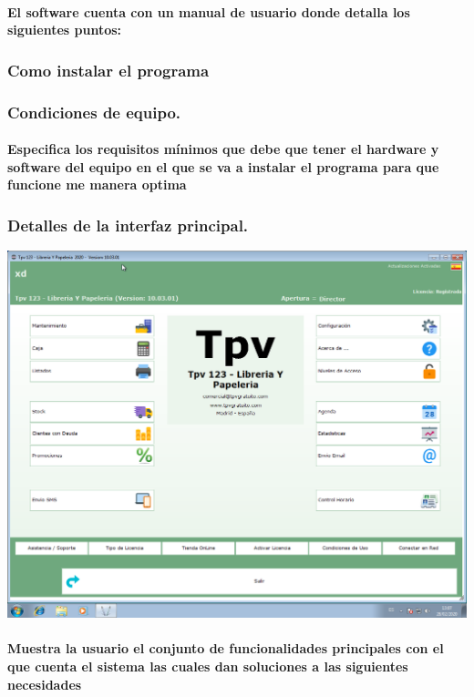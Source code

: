 \documentclass[12pt,a4paper]{ articule }
\begin{document}
\paragraph{El software cuenta con un manual de usuario donde detalla los siguientes puntos:}
\subsubsection*{Como instalar el programa}
\subsubsection*{Condiciones de equipo.}
\paragraph{Especifica los requisitos mínimos que debe que tener el hardware y software del equipo en el que se va a instalar el programa para que funcione me manera optima}
\subsubsection*{Detalles de la interfaz principal.}
\includegraphics[scale=0.35]{tpv.png} 
\paragraph{Muestra la usuario el conjunto de funcionalidades principales con el que cuenta el sistema las cuales dan soluciones a las siguientes necesidades}
\end{document}
